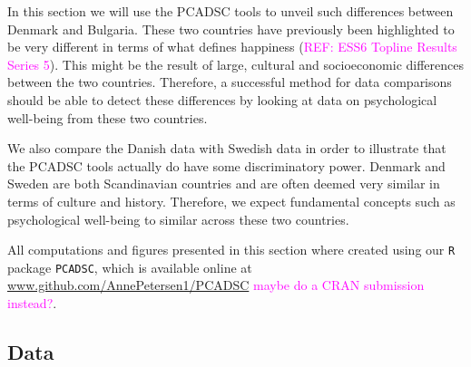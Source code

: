 \documentclass[titlepage,11pt,twoside]{article}
\newcommand{\hl}[1]{\textcolor{magenta}{#1}}
\newcommand{\R}[1]{\texttt{#1}}
\begin{document}
In this section we will use the PCADSC tools to unveil such differences between Denmark and Bulgaria. These two countries have previously been highlighted to be very different in terms of what defines happiness (\hl{REF: ESS6 Topline Results Series 5}). This might be the result of large, cultural and socioeconomic differences between the two countries. Therefore, a successful method for data comparisons should be able to detect these differences by looking at data on psychological well-being from these two countries.

We also compare the Danish data with Swedish data in order to illustrate that the PCADSC tools actually do have some discriminatory power. Denmark and Sweden are both Scandinavian countries and are often deemed very similar in terms of culture and history. Therefore, we expect fundamental concepts such as psychological well-being to similar across these two countries.




All computations and figures presented in this section where created using our \R{R} package \R{PCADSC}, which is available online at \url{www.github.com/AnnePetersen1/PCADSC} \hl{maybe do a CRAN submission instead?}.

\subsection{Data}

\end{document}
